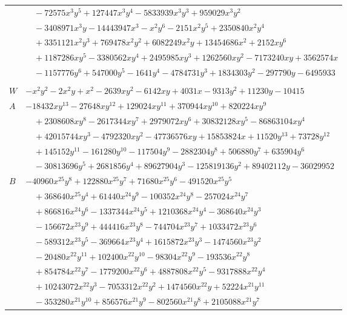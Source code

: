 \documentclass[11pt]{article}
\begin{document}
\begin{longtable}{@{}ll@{}}
 & $\quad -72575x^{3}y^{5}+127447x^{3}y^{4}-5833939x^{3}y^{3}+959029x^{3}y^{2}$\\
 & $\quad -3408971x^{3}y-14443947x^{3}-x^{2}y^{6}-2151x^{2}y^{5}+2350840x^{2}y^{4}$\\
 & $\quad +3351121x^{2}y^{3}+769478x^{2}y^{2}+6082249x^{2}y+13454686x^{2}+2152xy^{6}$\\
 & $\quad +1187286xy^{5}-3380562xy^{4}+2495985xy^{3}+1262560xy^{2}-7173240xy+3562574x$\\
 & $\quad -1157776y^{6}+547000y^{5}-1641y^{4}-4784731y^{3}+1834303y^{2}-297790y-6495933$\\
\addlinespace[3pt]
\multicolumn{2}{@{}l}{$i=44$, $m=16$, neighbours $47,48,49,50,51,52,54,55,58,63,64,65,66,67,69,71,188,189$}\\
$W$ & $-x^{2}y^{2}-2x^{2}y+x^{2}-2639xy^{2}-6142xy+4031x-9313y^{2}+11230y-10415$\\
$A$ & $-18432xy^{13}-27648xy^{12}+129024xy^{11}+370944xy^{10}+820224xy^{9}$\\
 & $\quad +2308608xy^{8}-2617344xy^{7}+2979072xy^{6}+30832128xy^{5}-86863104xy^{4}$\\
 & $\quad +42015744xy^{3}-4792320xy^{2}-47736576xy+15853824x+11520y^{13}+73728y^{12}$\\
 & $\quad +145152y^{11}-161280y^{10}-117504y^{9}-2882304y^{8}+506880y^{7}+635904y^{6}$\\
 & $\quad -30813696y^{5}+2681856y^{4}+89627904y^{3}-125819136y^{2}+89402112y-36029952$\\
$B$ & $-40960x^{25}y^{8}+122880x^{25}y^{7}+71680x^{25}y^{6}-491520x^{25}y^{5}$\\
 & $\quad +368640x^{25}y^{4}+61440x^{24}y^{9}-100352x^{24}y^{8}-257024x^{24}y^{7}$\\
 & $\quad +866816x^{24}y^{6}-1337344x^{24}y^{5}+1210368x^{24}y^{4}-368640x^{24}y^{3}$\\
 & $\quad -156672x^{23}y^{9}+444416x^{23}y^{8}-744704x^{23}y^{7}+1033472x^{23}y^{6}$\\
 & $\quad -589312x^{23}y^{5}-369664x^{23}y^{4}+1615872x^{23}y^{3}-1474560x^{23}y^{2}$\\
 & $\quad -20480x^{22}y^{11}+102400x^{22}y^{10}-98304x^{22}y^{9}-193536x^{22}y^{8}$\\
 & $\quad +854784x^{22}y^{7}-1779200x^{22}y^{6}+4887808x^{22}y^{5}-9317888x^{22}y^{4}$\\
 & $\quad +10243072x^{22}y^{3}-7053312x^{22}y^{2}+1474560x^{22}y+52224x^{21}y^{11}$\\
 & $\quad -353280x^{21}y^{10}+856576x^{21}y^{9}-802560x^{21}y^{8}+2105088x^{21}y^{7}$\\

\end{longtable}
\end{document}
